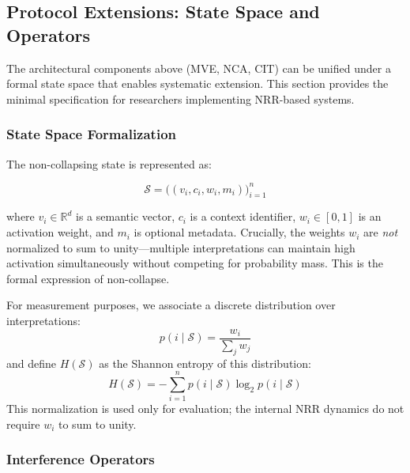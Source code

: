 \documentclass[11pt,a4paper]{article}
\begin{document}
\subsection{Protocol Extensions: State Space and Operators}
\label{sec:protocol}

The architectural components above (MVE, NCA, CIT) can be unified under a formal state space that enables systematic extension. This section provides the minimal specification for researchers implementing NRR-based systems.

\subsubsection{State Space Formalization}

The non-collapsing state is represented as:

\begin{equation}
\mathcal{S} = \bigl((v_i, c_i, w_i, m_i)\bigr)_{i=1}^{n}
\end{equation}

where $v_i \in \mathbb{R}^d$ is a semantic vector, $c_i$ is a context identifier, $w_i \in [0,1]$ is an activation weight, and $m_i$ is optional metadata. Crucially, the weights $w_i$ are \textit{not} normalized to sum to unity---multiple interpretations can maintain high activation simultaneously without competing for probability mass. This is the formal expression of non-collapse.

For measurement purposes, we associate a discrete distribution over interpretations:
\begin{equation}
p(i \mid \mathcal{S}) = \frac{w_i}{\sum_j w_j}
\end{equation}
and define $H(\mathcal{S})$ as the Shannon entropy of this distribution:
\begin{equation}
H(\mathcal{S}) = - \sum_{i=1}^{n} p(i \mid \mathcal{S}) \log_2 p(i \mid \mathcal{S})
\end{equation}
This normalization is used only for evaluation; the internal NRR dynamics do not require $w_i$ to sum to unity.

\subsubsection{Interference Operators}
\end{document}
